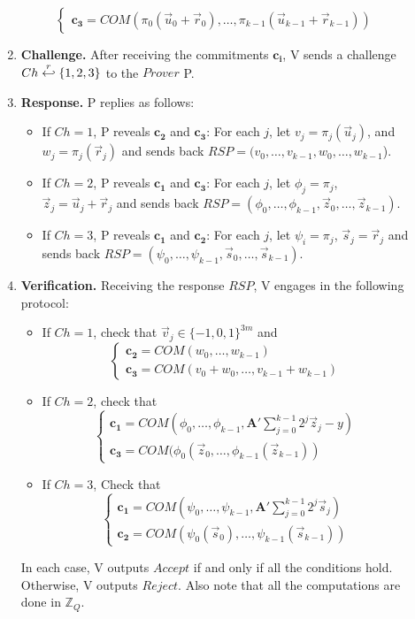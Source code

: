 \begin{description}
\begin{enumerate}
\[\begin{cases}
        \mathbf{c_3} = COM(\pi_0(\vec{u}_0 + \vec{r}_0), \dots, \pi_{k-1}(\vec{u}_{k-1} + \vec{r}_{k-1}))
      \end{cases}
    \]
  \item \textbf{Challenge.} After receiving the commitments $\mathbf{c_i}$, V sends a challenge
    $Ch \stackrel{r}{\hookleftarrow} \{1,2,3\}$ to the $Prover$ P.
  \item \textbf{Response.} P replies as follows:
    \begin{itemize}
    \item If $Ch = 1$, P reveals $\mathbf{c_2}$ and $\mathbf{c_3}$: For each $j$, let $v_j = \pi_j(\vec{u}_j)$, and
      $w_j = \pi_j(\vec{r}_j)$ and sends back $RSP = (v_0,\dots, v_{k-1},w_0,\dots,w_{k-1}$).
    \item If $Ch = 2$, P reveals $\mathbf{c_1}$ and $\mathbf{c_3}$: For each $j$, let $\phi_j = \pi_j$,
      $\vec{z}_j = \vec{u}_j +\vec{r}_j$ and sends back
      $RSP = (\phi_0,\dots,\phi_{k-1}, \vec{z}_0, \dots, \vec{z}_{k-1})$.
    \item If $Ch = 3$, P reveals $\mathbf{c_1}$ and $\mathbf{c_2}$: For each $j$, let $\psi_i = \pi_j$,
      $\vec{s}_j = \vec{r}_j$ and sends back $RSP = (\psi_0, \dots, \psi_{k-1}, \vec{s}_0, \dots, \vec{s}_{k-1})$.
    \end{itemize}
  \item \textbf{Verification.} Receiving the response $RSP$, V engages in the following protocol:
    \begin{itemize}
    \item If $Ch = 1$, check that $\vec{v}_j \in \{-1,0,1\}^{3m}$ and
      \[
        \begin{cases}
          \mathbf{c_2} = COM(w_0,\dots,w_{k-1})\\
          \mathbf{c_3} = COM(v_0 + w_0, \dots, v_{k-1} + w_{k-1})
        \end{cases}
      \]
    \item If $Ch = 2$, check that
      \[
        \begin{cases}
          \mathbf{c_1} = COM(\phi_0,\dots,\phi_{k-1},\mathbf{A'}
          \sum_{j=0}^{k-1}2^j\vec{z}_j - y)\\
          \mathbf{c_3} = COM(\phi_0(\vec{z}_0,\dots,\phi_{k-1}( \vec{z}_{k-1}))
        \end{cases}
      \]
    \item If $Ch = 3$, Check that
      \[
        \begin{cases}
          \mathbf{c_1} = COM(\psi_0, \dots, \psi_{k-1}, \mathbf{A'}
          \sum_{j=0}^{k-1}2^j\vec{s}_j)\\
          \mathbf{c_2} = COM(\psi_0(\vec{s}_0),\dots, \psi_{k-1}( \vec{s}_{k-1}))
        \end{cases}
      \]
    \end{itemize}
    In each case, V outputs $Accept$ if and only if all the conditions
    hold. Otherwise, V outputs $Reject$. Also note that all the computations are
    done in $\mathbb{Z}_Q$.

  \end{enumerate}
\end{description}

